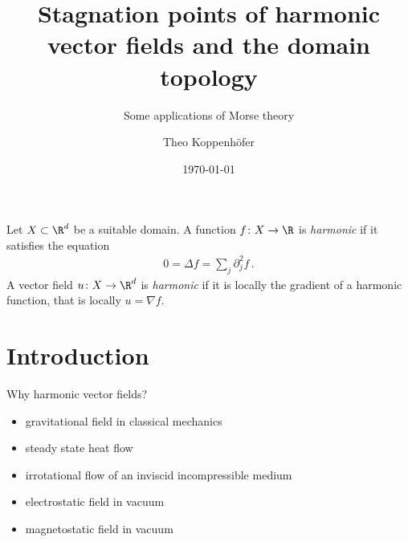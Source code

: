 





\title{Stagnation points of harmonic vector fields and the domain topology}
\subtitle{Some applications of Morse theory}
\author{Theo Koppenhöfer}
\date{\today}


\graphicspath{{../Art/}}
\graphicspath{{../Plots/}}
\graphicspath{{../Figures/}}

\tikzexternaldisable


\usepackage{transparent}

\newcommand{\openX}{\interior\brk*{X}}





{
\frame[plain]{\titlepage}
}


\begin{frame}
  \begin{definition}
    Let $X\subset\R^d$ be a suitable domain.
    A function $f\colon X\to\R$ is \emph{harmonic} if it satisfies the equation
    \begin{align*}
      0=\Delta f=\sum_j\partial_j^2f\,.
    \end{align*}
    A vector field $u\colon X\to\R^d$ is \emph{harmonic} if it is locally the gradient of a harmonic function, that is locally $u=\nabla f$.
  \end{definition}
\end{frame}

\section{Introduction}
\begin{frame}[fragile]
  \begin{block}{Why harmonic vector fields?}
    \begin{itemize}
      \item gravitational field in classical mechanics
      \item steady state heat flow
      \item irrotational flow of an inviscid incompressible medium
      \item electrostatic field in vacuum
      \item magnetostatic field in vacuum
    \end{itemize}
  \end{block}
\end{frame}

